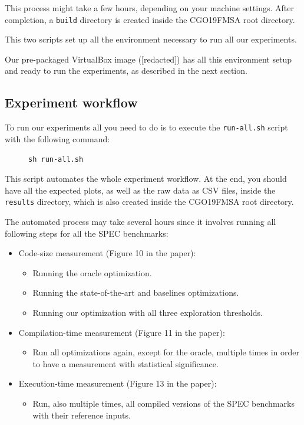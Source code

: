 {This process might take a few hours, depending on your machine settings.
After completion, a \texttt{build} directory is created inside the CGO19FMSA
root directory.

This two scripts set up all the environment necessary to run all our experiments.

Our pre-packaged VirtualBox image ([redacted]) %
has all this environment setup and ready to run the experiments, as described
in the next section.

\subsection{Experiment workflow}

To run our experiments all you need to do is to execute the \texttt{run-all.sh} script
with the following command:
\begin{figure}[h]
\texttt{sh run-all.sh}
\end{figure}

This script automates the whole experiment workflow.
At the end, you should have all the expected plots, as well as the raw data as CSV files,
inside the \texttt{results} directory, which is also created inside the CGO19FMSA
root directory.

The automated process may take several hours since it involves running all following steps for all the SPEC benchmarks:

\noindent{}
\begin{itemize}
  \item Code-size measurement (Figure 10 in the paper):
\begin{itemize}
  \item Running the oracle optimization.
  \item Running the state-of-the-art and baselines optimizations.
  \item Running our optimization with all three exploration thresholds.
\end{itemize}
  \item Compilation-time measurement (Figure 11 in the paper):
\begin{itemize}
  \item Run all optimizations again, except for the oracle, multiple times in order to have a measurement with statistical significance.
\end{itemize}
  \item Execution-time measurement (Figure 13 in the paper):
\begin{itemize}
  \item Run, also multiple times, all compiled versions of the SPEC benchmarks with their reference inputs.
\end{itemize}
\end{itemize}

}
